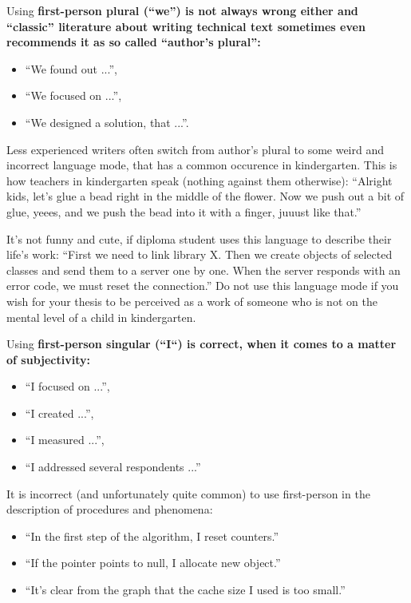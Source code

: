 Using \bf first-person plural \rm (``we'') is not always wrong either and ``classic'' literature about writing technical text sometimes even recommends it as so called ``author's plural'':
\begin{itemize}
  \item{``We found out ...''},
  \item{``We focused on ...''},
  \item{``We designed a solution, that ...''}.
\end{itemize}

Less experienced writers often switch from author's plural to some weird and incorrect language mode, that has a common occurence in kindergarten. This is how teachers in kindergarten speak (nothing against them otherwise): ``Alright kids, let's glue a bead right in the middle of the flower. Now we push out a bit of glue, yeees, and we push the bead into it with a finger, juuust like that.''

It's not funny and cute, if diploma student uses this language to describe their life's work: ``First we need to link library X. Then we create objects of selected classes and send them to a server one by one. When the server responds with an error code, we must reset the connection.'' Do not use this language mode if you wish for your thesis to be perceived as a work of someone who is not on the mental level of a child in kindergarten.

Using \bf first-person singular \rm (``I``) is correct, when it comes to a matter of subjectivity:
\begin{itemize}
  \item{``I focused on ...''},
  \item{``I created ...''},
  \item{``I measured ...''},
  \item{``I addressed several respondents ...''}
\end{itemize}

It is incorrect (and unfortunately quite common) to use first-person in the description of procedures and phenomena:
\begin{itemize}
  \item{``In the first step of the algorithm, I reset counters.''}
  \item{``If the pointer points to null, I allocate new object.''}
  \item{``It's clear from the graph that the cache size I used is too small.''}
\end{itemize}

